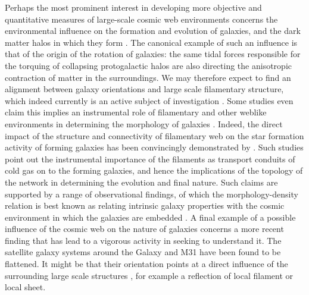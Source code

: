 \documentclass[useAMS,usenatbib]{mnras}
\begin{document}
Perhaps the most prominent interest in developing more objective and quantitative measures of large-scale cosmic web 
environments concerns the environmental influence on the formation and evolution of galaxies, and the dark matter 
halos in which they form \citep[see e.g.][]{hahn2007b,hahnphd2009,cautun2014}. The canonical example of such 
an influence is that of the origin of the rotation of galaxies: the same tidal forces responsible for the torquing of collapsing 
protogalactic halos \citep{hoyle1951,peebles1969,doroshkevich1970} are also directing the anisotropic contraction of matter in 
the surroundings. We may therefore expect to find an alignment between galaxy orientations and large scale filamentary 
structure, which indeed currently is an active subject of investigation \citep[e.g.][]{aragon2007a,leepen2000,jones2010,codis2012,tempel2012,2013MNRAS.428.2489L,
tempel2013,trowland2013,trowlandphd2013,aragon2014,2016MNRAS.457..695P,hirv2017,2017MNRAS.464.4666G}. Some studies even claim this implies an instrumental 
role of filamentary and other weblike environments in determining 
the morphology of galaxies \citep[see e.g.][for a short review]{pichon2016}. Indeed, the direct impact of the structure and 
connectivity of filamentary web on the star formation activity of forming galaxies has been convincingly demonstrated 
by \citet[][see also \citealt{2009ApJ...703..785D,2015MNRAS.449.2087D,2015MNRAS.454..637G,aragon2016}]{2009Natur.457..451D}. Such studies point out the instrumental importance of the filaments as transport conduits of cold 
gas on to the forming galaxies, and hence the implications of the topology of the network in determining the evolution and 
final nature. Such claims are supported by a range of observational findings, of which the morphology-density relation 
\citep{dressler1980} is best known as relating intrinsic galaxy properties with the cosmic environment in which the 
galaxies are embedded \citep[see e.g.][]{kuutma2017}. A final example of a possible influence of the cosmic web on the nature of 
galaxies concerns a more recent finding that has lead to a vigorous activity in seeking to understand it. The satellite galaxy 
systems around the Galaxy and M31 have been found to be flattened. It might be that their orientation points at a direct influence 
of the surrounding large scale structures \citep[see][]{ibata2013,cautun2015,2015MNRAS.452.1052L,2015ApJ...800...34G,2015ApJ...799...45F,2016ApJ...829...58G}, for example a reflection of local filament or local sheet. 

\end{document}
